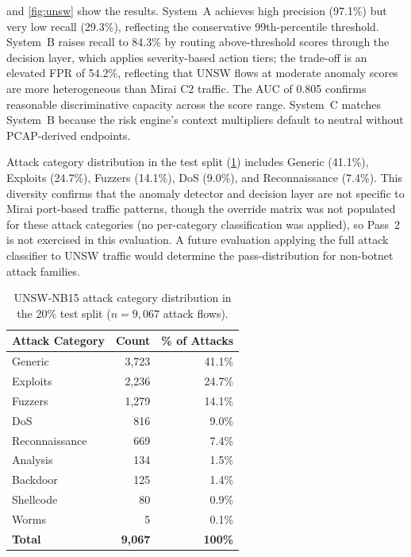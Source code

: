 \documentclass[preprint,12pt,authoryear]{elsarticle}
\begin{document}
 and \cref{fig:unsw} show the results. System~A achieves high
precision (97.1\%) but very low recall (29.3\%), reflecting the conservative
99th-percentile threshold. System~B raises recall to 84.3\% by routing
above-threshold scores through the decision layer, which applies severity-based
action tiers; the trade-off is an elevated FPR of 54.2\%, reflecting that UNSW
flows at moderate anomaly scores are more heterogeneous than Mirai C2 traffic.
The AUC of 0.805 confirms reasonable discriminative capacity across the score
range. System~C matches System~B because the risk engine's context multipliers
default to neutral without PCAP-derived endpoints.

Attack category distribution in the test split (\cref{tab:unsw_cats}) includes
Generic (41.1\%), Exploits (24.7\%), Fuzzers (14.1\%), DoS (9.0\%), and
Reconnaissance (7.4\%). This diversity confirms that the anomaly detector and
decision layer are not specific to Mirai port-based traffic patterns, though the
override matrix was not populated for these attack categories (no per-category
classification was applied), so Pass~2 is not exercised in this evaluation.
A future evaluation applying the full attack classifier to UNSW traffic would
determine the pass-distribution for non-botnet attack families.

\begin{table}[htb]
\caption{UNSW-NB15 attack category distribution in the 20\% test split
  ($n = 9{,}067$ attack flows).}
\label{tab:unsw_cats}
\centering
\begin{tabular}{lrr}
\toprule
\textbf{Attack Category} & \textbf{Count} & \textbf{\% of Attacks} \\
\midrule
Generic         & 3{,}723 & 41.1\% \\
Exploits        & 2{,}236 & 24.7\% \\
Fuzzers         & 1{,}279 & 14.1\% \\
DoS             &   816   &  9.0\% \\
Reconnaissance  &   669   &  7.4\% \\
Analysis        &   134   &  1.5\% \\
Backdoor        &   125   &  1.4\% \\
Shellcode       &    80   &  0.9\% \\
Worms           &     5   &  0.1\% \\
\midrule
\textbf{Total}  & \textbf{9{,}067} & \textbf{100\%} \\
\bottomrule
\end{tabular}
\end{table}
\end{document}
